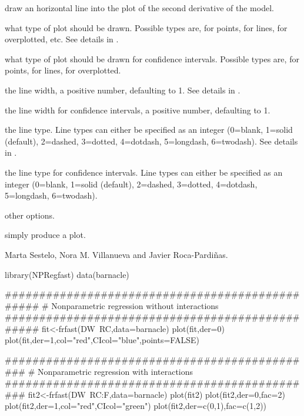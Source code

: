 \begin{Arguments}
\begin{ldescription}
\item[\code{abline}] draw an horizontal line into the plot of the second derivative of the model.

\item[\code{type}] 
what type of plot should be drawn. Possible types are,  for points,  for lines,  for overplotted, etc. See details in .

\item[\code{CItype}] 
what type of plot should be drawn for confidence intervals. Possible types are,  for points,  for lines,  for overplotted.

\item[\code{lwd}] the line width, a positive number, defaulting to 1.  See details in .

\item[\code{CIlwd}] the line width for confidence intervals, a positive number, defaulting to 1. 

\item[\code{lty}] the line type. Line types can either be specified as an integer (0=blank, 1=solid (default), 2=dashed, 3=dotted, 4=dotdash, 5=longdash, 6=twodash).  See details in .

\item[\code{CIlty}] the line type for confidence intervals. Line types can either be specified as an integer (0=blank, 1=solid (default), 2=dashed, 3=dotted, 4=dotdash, 5=longdash, 6=twodash). 

\item[\code{...}] 
other options.

\end{ldescription}
\end{Arguments}
%
\begin{Value}
simply produce a plot.
\end{Value}
%
\begin{Author}\relax
Marta Sestelo, Nora M. Villanueva and Javier Roca-Pardiñas.
\end{Author}
%
\begin{Examples}
\begin{ExampleCode}

library(NPRegfast)
data(barnacle)

################################################
# Nonparametric regression without interactions
################################################
fit<-frfast(DW~RC,data=barnacle)
plot(fit,der=0)
plot(fit,der=1,col="red",CIcol="blue",points=FALSE)

##############################################
# Nonparametric regression with interactions
##############################################
fit2<-frfast(DW~RC:F,data=barnacle)
plot(fit2)
plot(fit2,der=0,fac=2)
plot(fit2,der=1,col="red",CIcol="green")
plot(fit2,der=c(0,1),fac=c(1,2))
\end{ExampleCode}
\end{Examples}


